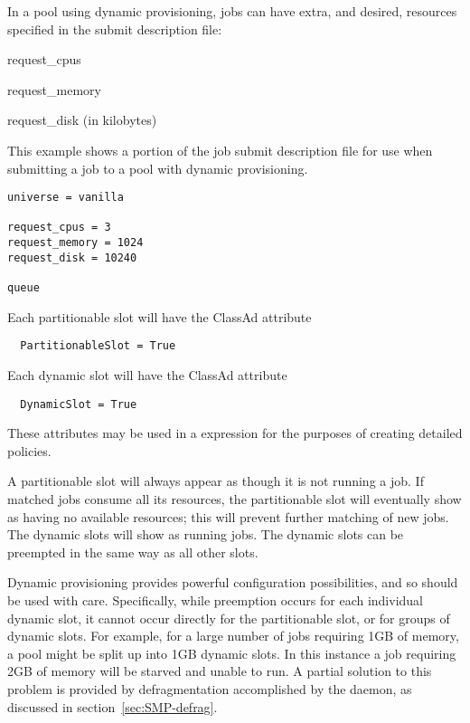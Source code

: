 In a pool using dynamic provisioning, 
jobs can have extra, and desired, resources specified in the submit
description file:
\begin{description}
  \item{request\_cpus}
  \item{request\_memory}
  \item{request\_disk (in kilobytes)}
\end{description}

This example shows a portion of the job submit description file
for use when submitting a job to a pool with dynamic provisioning.
\begin{verbatim}
universe = vanilla

request_cpus = 3
request_memory = 1024
request_disk = 10240

queue 
\end{verbatim}

Each partitionable slot will have
the ClassAd attribute
\begin{verbatim}
  PartitionableSlot = True
\end{verbatim}
Each dynamic slot will have the ClassAd attribute 
\begin{verbatim}
  DynamicSlot = True
\end{verbatim}
These attributes may be used in a  expression for 
the purposes of creating detailed policies.

A partitionable slot will always appear as though it is not running a job.
If matched jobs consume all its resources,
the partitionable slot  will eventually show as having no available resources; 
this will prevent further matching of new jobs.
The dynamic slots will show as running jobs.
The dynamic slots can be preempted in the same way as all other slots.

Dynamic provisioning provides powerful configuration
possibilities, and so should be used with care. 
Specifically, while preemption occurs for each individual dynamic slot,
it cannot occur directly for the partitionable slot, 
or for groups of dynamic slots. 
For example, for a large number of jobs requiring 1GB of memory,
a pool might be split up into 1GB dynamic slots. 
In this instance a job requiring 2GB of memory will be starved
and unable to run.  A partial solution to this problem is provided
by defragmentation accomplished by the  daemon,
as discussed in section~\ref{sec:SMP-defrag}.

